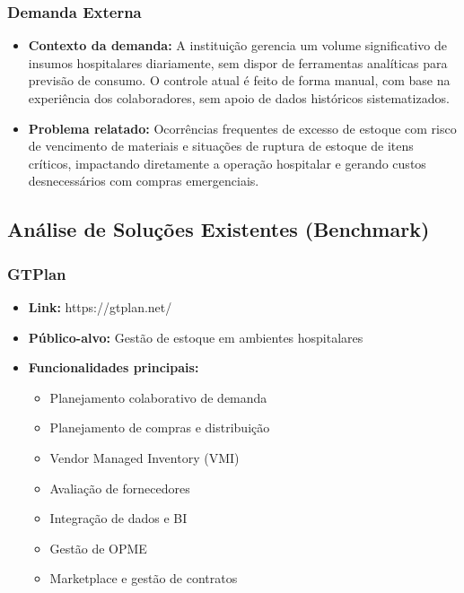 \documentclass[12pt,a4paper]{article}
\begin{document}
\subsubsection{Demanda Externa}

\begin{itemize}
    \item \textbf{Contexto da demanda:} A instituição gerencia um volume significativo de insumos hospitalares diariamente, sem dispor de ferramentas analíticas para previsão de consumo. O controle atual é feito de forma manual, com base na experiência dos colaboradores, sem apoio de dados históricos sistematizados.
    \item \textbf{Problema relatado:} Ocorrências frequentes de excesso de estoque com risco de vencimento de materiais e situações de ruptura de estoque de itens críticos, impactando diretamente a operação hospitalar e gerando custos desnecessários com compras emergenciais.
\end{itemize}

\subsection{Análise de Soluções Existentes (Benchmark)}

\subsubsection{GTPlan}

\begin{itemize}
    \item \textbf{Link:} https://gtplan.net/
    \item \textbf{Público-alvo:} Gestão de estoque em ambientes hospitalares
    \item \textbf{Funcionalidades principais:}
          \begin{itemize}
              \item Planejamento colaborativo de demanda
              \item Planejamento de compras e distribuição
              \item Vendor Managed Inventory (VMI)
              \item Avaliação de fornecedores
              \item Integração de dados e BI
              \item Gestão de OPME
              \item Marketplace e gestão de contratos
          \end{itemize}
\end{itemize}
\end{document}
